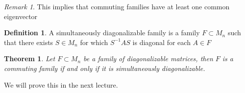 \documentclass[11pt]{article}
\theoremstyle{plain} %
\newtheorem{theorem}{Theorem}[section]
\theoremstyle{definition} %
\newtheorem{definition}{Definition}[section]
\theoremstyle{remark} %
\newtheorem{remark}{Remark}[section]
\begin{document}
\begin{remark}
  This implies that commuting families have at least one common eigenvector
\end{remark}

\begin{definition}
  A simultaneously diagonalizable family is a family $F \subset M_n$
  such that there exists $S \in M_n$ for which $S^{-1} A S$ is
  diagonal for each $A \in F$
\end{definition}

\begin{theorem}
  Let $F \subset M_n$ be a family of diagonalizable matrices, then
  $F$ is a commuting family if and only if it is simultaneously diagonalizable.
\end{theorem}
We will prove this in the next lecture.

\printbibliography[heading=bibintoc]
\end{document}
